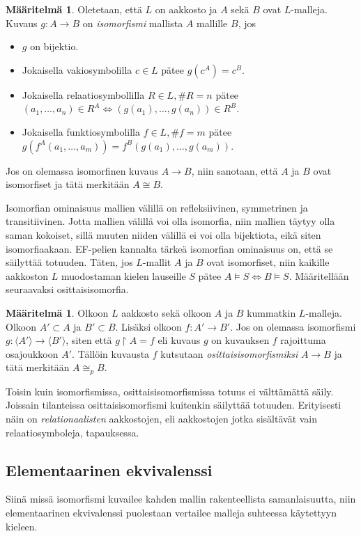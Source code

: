 \documentclass[finnish]{tktltiki2}
\theoremstyle{definition}
\newtheorem{maar}[lau]{Määritelmä}
\theoremstyle{remark}
\begin{document}
\begin{maar}
Oletetaan, että $L$ on aakkosto ja $A$ sekä $B$ ovat $L$-malleja. Kuvaus $g: A \rightarrow B$ on \textit{isomorfismi} mallista $A$ mallille $B$, jos
\begin{itemize}
\item $g$ on bijektio.
\item Jokaisella vakiosymbolilla $c \in L$ pätee $g(c^A) = c^B$.
\item Jokaisella relaatiosymbollilla $R \in L, \#R = n$ pätee $(a_1, \ldots, a_n) \in R^A \Longleftrightarrow (g(a_1), \ldots, g(a_n)) \in R^B$.
\item Jokaisella funktiosymbolilla $f \in L, \#f = m$ pätee $g(f^A(a_1, \ldots, a_m)) = f^B(g(a_1), \ldots, g(a_m))$.
\end{itemize}
Jos on olemassa isomorfinen kuvaus $A \rightarrow B$, niin sanotaan, että $A$ ja $B$ ovat isomorfiset ja tätä merkitään $A \cong B$.
\end{maar}

Isomorfian ominaisuus mallien välillä on refleksiivinen, symmetrinen ja transitiivinen. Jotta mallien välillä voi olla isomorfia, niin mallien täytyy olla saman kokoiset, sillä muuten niiden välillä ei voi olla bijektiota, eikä siten isomorfiaakaan. EF-pelien kannalta tärkeä isomorfian ominaisuus on, että se säilyttää totuuden. Täten, jos $L$-mallit $A$ ja $B$ ovat isomorfiset, niin kaikille aakkoston $L$ muodostaman kielen lauseille $S$ pätee $A \vDash S \Longleftrightarrow B \vDash S$. Määritellään seuraavaksi osittaisisomorfia.

\begin{maar}
Olkoon $L$ aakkosto sekä olkoon $A$ ja $B$ kummatkin $L$-malleja. Olkoon $A' \subset A$ ja $B' \subset B$. Lisäksi olkoon $f: A' \rightarrow B'$. Jos on olemassa isomorfismi $g: \langle A' \rangle \rightarrow \langle B' \rangle$, siten että $g \restriction A = f$ eli kuvaus $g$ on kuvauksen $f$ rajoittuma osajoukkoon $A'$. Tällöin kuvausta $f$ kutsutaan \textit{osittaisisomorfismiksi} $A \rightarrow B$ ja tätä merkitään $A \cong_p B$.
\end{maar}

Toisin kuin isomorfismissa, osittaisisomorfismissa totuus ei välttämättä säily. Joissain tilanteissa osittaisisomorfismi kuitenkin säilyttää totuuden. Erityisesti näin on \textit{relationaalisten} aakkostojen, eli aakkostojen jotka sisältävät vain relaatiosymboleja, tapauksessa.

\subsection{Elementaarinen ekvivalenssi}
Siinä missä isomorfismi kuvailee kahden mallin rakenteellista samanlaisuutta, niin elementaarinen ekvivalenssi puolestaan vertailee malleja suhteessa käytettyyn kieleen.
\end{document}
